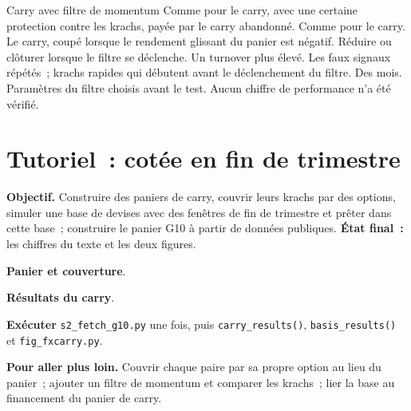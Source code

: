 \begin{strategyfile}{Carry avec filtre de momentum}\label{strat:s2:cross-currency-basis-and-fx-carry:momentum}
 Comme pour le carry, avec une certaine protection contre les krachs, payée par le carry abandonné.
 Comme pour le carry.
 Le carry, coupé lorsque le rendement glissant du panier est négatif.
 Réduire ou clôturer lorsque le filtre se déclenche.
 Un turnover plus élevé.
 Les faux signaux répétés~; krachs rapides qui débutent avant le déclenchement du filtre.
 Des mois.
 Paramètres du filtre choisis avant le test.
 Aucun chiffre de performance n'a été vérifié.
\end{strategyfile}

\section{Tutoriel~: cotée en fin de trimestre}\label{tut:s2:cross-currency-basis-and-fx-carry:tut}

\begin{tutorial}
\textbf{Objectif.} Construire des paniers de carry, couvrir leurs krachs par des options, simuler une base de devises avec des fenêtres de fin de trimestre et prêter dans cette base~;
construire le panier G10 à partir de données publiques. \textbf{État final~:} les chiffres du texte et les deux figures.
\begin{tutsteps}
\item \textbf{Panier et couverture}.
\label{lst:s2:cross-currency-basis-and-fx-carry:hedge}
\item \textbf{Résultats du carry}.
\label{lst:s2:cross-currency-basis-and-fx-carry:results}
\item \textbf{Exécuter} \texttt{s2\_fetch\_g10.py} une fois, puis \texttt{carry\_results()}, \texttt{basis\_results()} et \texttt{fig\_fxcarry.py}.
\end{tutsteps}
\textbf{Pour aller plus loin.} Couvrir chaque paire par sa propre option au lieu du panier~; ajouter un filtre de momentum et comparer les krachs~; lier la base
au financement du panier de carry.
\end{tutorial}

